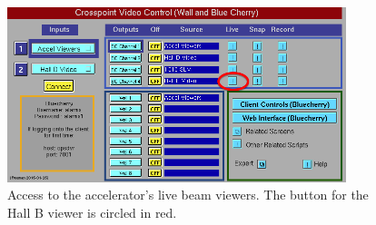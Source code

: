 \documentclass[amsmath,amssymb,notitlepage,11pt]{revtex4}
\begin{document}
\begin{figure}[htbp]\centering
  \includegraphics[width=0.88\textwidth]{pics/viewer}
  \caption{Access to the accelerator's live beam viewers.  The button for the Hall B viewer is circled in red.\label{fig:viewer}}
\end{figure}
\end{document}
